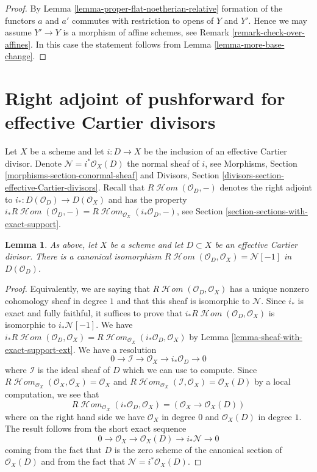 \documentclass{stacks-project}
\theoremstyle{plain}
\newtheorem{lemma}[subsection]{Lemma}
\theoremstyle{definition}
\theoremstyle{remark}
\numberwithin{equation}{subsection}
\def\SheafHom{\mathop{\mathcal{H}\!\mathit{om}}\nolimits}
\begin{document}
\begin{proof}
By Lemma \ref{lemma-proper-flat-noetherian-relative} formation of the
functors $a$ and $a'$ commutes with restriction to opens of $Y$ and $Y'$.
Hence we may assume $Y' \to Y$ is a morphism of affine schemes, see
Remark \ref{remark-check-over-affines}. In this
case the statement follows from Lemma \ref{lemma-more-base-change}.
\end{proof}



\section{Right adjoint of pushforward for effective Cartier divisors}
\label{section-dualizing-Cartier}

\noindent
Let $X$ be a scheme and let $i : D \to X$ be the inclusion of an
effective Cartier divisor. Denote $\mathcal{N} = i^*\mathcal{O}_X(D)$
the normal sheaf of $i$, see
Morphisms, Section \ref{morphisms-section-conormal-sheaf}
and
Divisors, Section \ref{divisors-section-effective-Cartier-divisors}.
Recall that $R\SheafHom(\mathcal{O}_D, -)$
denotes the right adjoint to $i_* : D(\mathcal{O}_D) \to D(\mathcal{O}_X)$
and has the property
$i_*R\SheafHom(\mathcal{O}_D, -) =
R\SheafHom_{\mathcal{O}_X}(i_*\mathcal{O}_D, -)$,
see Section \ref{section-sections-with-exact-support}.

\begin{lemma}
\label{lemma-compute-for-effective-Cartier}
As above, let $X$ be a scheme and let $D \subset X$ be an
effective Cartier divisor. There is a canonical isomorphism
$R\SheafHom(\mathcal{O}_D, \mathcal{O}_X) = \mathcal{N}[-1]$
in $D(\mathcal{O}_D)$.
\end{lemma}

\begin{proof}
Equivalently, we are saying that $R\SheafHom(\mathcal{O}_D, \mathcal{O}_X)$
has a unique nonzero cohomology sheaf in degree $1$ and that this
sheaf is isomorphic to $\mathcal{N}$. Since $i_*$ is exact and fully
faithful, it suffices to prove that
$i_*R\SheafHom(\mathcal{O}_D, \mathcal{O}_X)$ is isomorphic
to $i_*\mathcal{N}[-1]$. We have
$i_*R\SheafHom(\mathcal{O}_D, \mathcal{O}_X) =
R\SheafHom_{\mathcal{O}_X}(i_*\mathcal{O}_D, \mathcal{O}_X)$
by Lemma \ref{lemma-sheaf-with-exact-support-ext}. We have a resolution
$$
0 \to \mathcal{I} \to \mathcal{O}_X \to i_*\mathcal{O}_D \to 0
$$
where $\mathcal{I}$ is the ideal sheaf of $D$
which we can use to compute. Since
$R\SheafHom_{\mathcal{O}_X}(\mathcal{O}_X, \mathcal{O}_X) = \mathcal{O}_X$ and
$R\SheafHom_{\mathcal{O}_X}(\mathcal{I}, \mathcal{O}_X) = \mathcal{O}_X(D)$ by
a local computation, we see that
$$
R\SheafHom_{\mathcal{O}_X}(i_*\mathcal{O}_D, \mathcal{O}_X) =
(\mathcal{O}_X \to \mathcal{O}_X(D))
$$
where on the right hand side we have $\mathcal{O}_X$ in degree $0$
and $\mathcal{O}_X(D)$ in degree $1$. The result follows from the
short exact sequence
$$
0 \to \mathcal{O}_X \to \mathcal{O}_X(D) \to i_*\mathcal{N} \to 0
$$
coming from the fact that $D$ is the zero scheme of the canonical section
of $\mathcal{O}_X(D)$ and from the fact that
$\mathcal{N} = i^*\mathcal{O}_X(D)$.
\end{proof}
\end{document}
